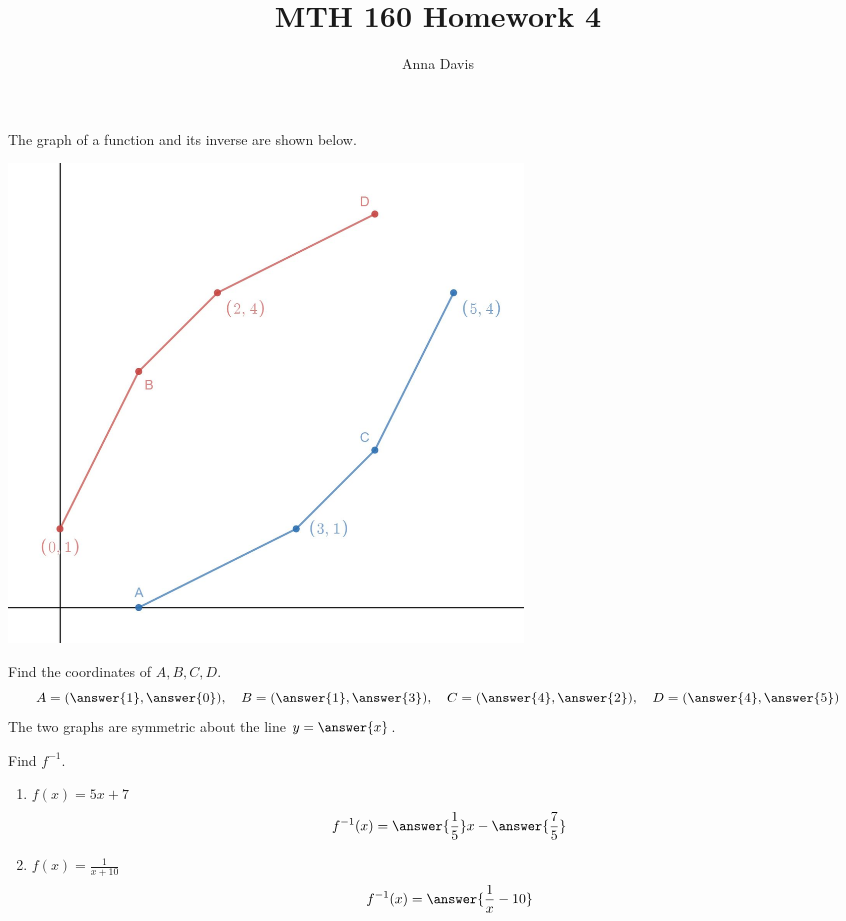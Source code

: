 \documentclass{ximera}
\author{Anna Davis} \title{MTH 160 Homework 4}
\begin{document}
\begin{abstract}

\end{abstract}
\maketitle


\begin{problem}\label{prob:160hom3prob3}
The graph of a function and its inverse are shown below.  
\begin{image}
   \includegraphics[height=5in]{160H3pic1.jpg}
 \end{image}
Find the coordinates of $A, B, C, D$.
$$A=(\answer{1},\answer{0}),\quad B=(\answer{1},\answer{3}),\quad C=(\answer{4},\answer{2}),\quad D=(\answer{4},\answer{5})$$
The two graphs are symmetric about the line
$y=\answer{x}$.
\end{problem}
\begin{problem}\label{prob:160hom3prob4}
Find $f^{-1}$.
\begin{enumerate}
    \item $f(x)=5x+7$
    $$f^{-1}(x)=\answer{\frac{1}{5}}x-\answer{\frac{7}{5}}$$
    \item $f(x)=\frac{1}{x+10}$
    $$f^{-1}(x)=\answer{\frac{1}{x}-10}$$
\end{enumerate}

\end{problem}
\end{document}
